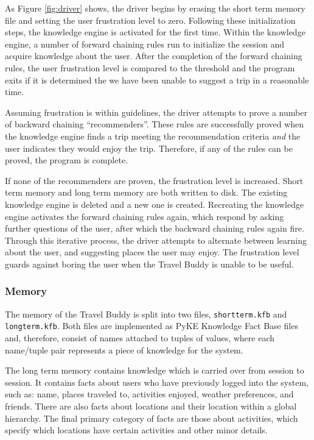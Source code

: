 \documentclass[11pt]{article} %
\begin{document}
As Figure \ref{fig:driver} shows, the driver begins by erasing the short term memory file and setting the user frustration level to zero. Following these initialization steps, the knowledge engine is activated for the first time. Within the knowledge engine, a number of forward chaining rules run to initialize the session and acquire knowledge about the user. After the completion of the forward chaining rules, the user frustration level is compared to the threshold and the program exits if it is determined the we have been unable to suggest a trip in a reasonable time.

Assuming frustration is within guidelines, the driver attempts to prove a number of backward chaining ``recommenders''. These rules are successfully proved when the knowledge engine finds a trip meeting the recommendation criteria \emph{and} the user indicates they would enjoy the trip. Therefore, if any of the rules can be proved, the program is complete.

If none of the recommenders are proven, the frustration level is increased. Short term memory and long term memory are both written to disk. The existing knowledge engine is deleted and a new one is created. Recreating the knowledge engine activates the forward chaining rules again, which respond by asking further questions of the user, after which the backward chaining rules again fire. Through this iterative process, the driver attempts to alternate between learning about the user, and suggesting places the user may enjoy. The frustration level guards against boring the user when the Travel Buddy is unable to be useful.

\subsubsection{Memory}
The memory of the Travel Buddy is split into two files, \texttt{shortterm.kfb} and \texttt{longterm.kfb}. Both files are implemented as PyKE Knowledge Fact Base files and, therefore, consist of names attached to tuples of values, where each name/tuple pair represents a piece of knowledge for the system.

The long term memory contains knowledge which is carried over from session to session. It contains facts about users who have previously logged into the system, such as: name, places traveled to, activities enjoyed, weather preferences, and friends. There are also facts about locations and their location within a global hierarchy. The final primary category of facts are those about activities, which specify which locations have certain activities and other minor details.
\end{document}
